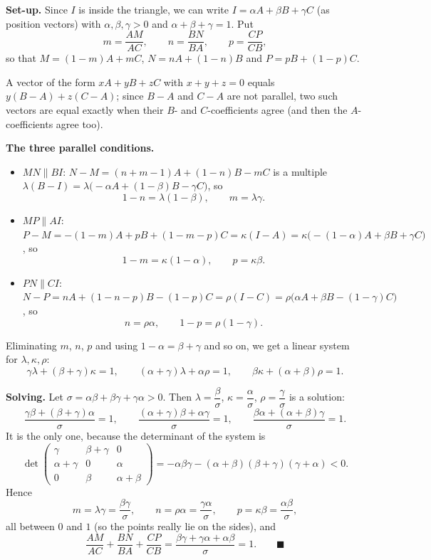 \textbf{Set-up.} Since $I$ is inside the triangle, we can write $I=\alpha A+\beta B+\gamma C$ (as position vectors) with $\alpha,\beta,\gamma>0$ and $\alpha+\beta+\gamma=1$. Put
\[
m=\dfrac{AM}{AC},\qquad n=\dfrac{BN}{BA},\qquad p=\dfrac{CP}{CB},
\]
so that $M=(1-m)A+mC$, $N=nA+(1-n)B$ and $P=pB+(1-p)C$.

A vector of the form $xA+yB+zC$ with $x+y+z=0$ equals $y(B-A)+z(C-A)$; since $B-A$ and $C-A$ are not parallel, two such vectors are equal exactly when their $B$- and $C$-coefficients agree (and then the $A$-coefficients agree too).

\textbf{The three parallel conditions.}
\begin{itemize}
\item $MN\parallel BI$: $N-M=(n+m-1)A+(1-n)B-mC$ is a multiple $\lambda(B-I)=\lambda\bigl(-\alpha A+(1-\beta)B-\gamma C\bigr)$, so
\[
1-n=\lambda(1-\beta),\qquad m=\lambda\gamma .
\]
\item $MP\parallel AI$: $P-M=-(1-m)A+pB+(1-m-p)C=\kappa(I-A)=\kappa\bigl(-(1-\alpha)A+\beta B+\gamma C\bigr)$, so
\[
1-m=\kappa(1-\alpha),\qquad p=\kappa\beta .
\]
\item $PN\parallel CI$: $N-P=nA+(1-n-p)B-(1-p)C=\rho(I-C)=\rho\bigl(\alpha A+\beta B-(1-\gamma)C\bigr)$, so
\[
n=\rho\alpha,\qquad 1-p=\rho(1-\gamma).
\]
\end{itemize}
Eliminating $m$, $n$, $p$ and using $1-\alpha=\beta+\gamma$ and so on, we get a linear system for $\lambda,\kappa,\rho$:
\[
\gamma\lambda+(\beta+\gamma)\kappa=1,\qquad (\alpha+\gamma)\lambda+\alpha\rho=1,\qquad \beta\kappa+(\alpha+\beta)\rho=1 .
\]

\textbf{Solving.} Let $\sigma=\alpha\beta+\beta\gamma+\gamma\alpha>0$. Then $\lambda=\dfrac{\beta}{\sigma}$, $\kappa=\dfrac{\alpha}{\sigma}$, $\rho=\dfrac{\gamma}{\sigma}$ is a solution:
\[
\dfrac{\gamma\beta+(\beta+\gamma)\alpha}{\sigma}=1,\qquad \dfrac{(\alpha+\gamma)\beta+\alpha\gamma}{\sigma}=1,\qquad \dfrac{\beta\alpha+(\alpha+\beta)\gamma}{\sigma}=1 .
\]
It is the only one, because the determinant of the system is
\[
\det\begin{pmatrix}\gamma&\beta+\gamma&0\\ \alpha+\gamma&0&\alpha\\ 0&\beta&\alpha+\beta\end{pmatrix}=-\alpha\beta\gamma-(\alpha+\beta)(\beta+\gamma)(\gamma+\alpha)<0 .
\]
Hence
\[
m=\lambda\gamma=\dfrac{\beta\gamma}{\sigma},\qquad n=\rho\alpha=\dfrac{\gamma\alpha}{\sigma},\qquad p=\kappa\beta=\dfrac{\alpha\beta}{\sigma},
\]
all between $0$ and $1$ (so the points really lie on the sides), and
\[
\dfrac{AM}{AC}+\dfrac{BN}{BA}+\dfrac{CP}{CB}=\dfrac{\beta\gamma+\gamma\alpha+\alpha\beta}{\sigma}=1 .\qquad\blacksquare
\]

